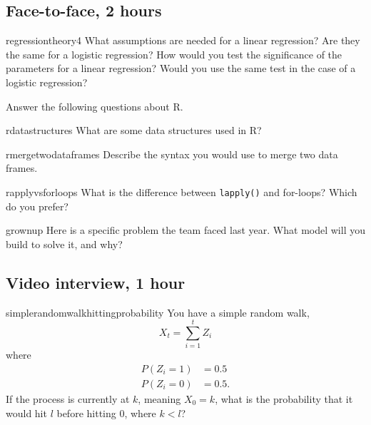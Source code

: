 \documentclass[a4paper]{article}
\begin{document}
\clearpage
\subsection{Face-to-face, 2 hours}
\begin{question}{regressiontheory4}
What assumptions are needed for a linear regression?
Are they the same for a logistic regression?
How would you test the significance of the parameters for a linear regression?
Would you use the same test in the case of a logistic regression?
\end{question}


\begin{questionwithnoanswer}
Answer the following questions about R.
\end{questionwithnoanswer}

\begin{subquestion}{rdatastructures}
What are some data structures used in R?
\end{subquestion}



\begin{subquestion}{rmergetwodataframes}
Describe the syntax you would use to merge two data frames.
\end{subquestion}



\begin{subquestion}{rapplyvsforloops}
What is the difference between \verb+lapply()+ and for-loops?
Which do you prefer?
\end{subquestion}


\begin{question}{grownup}
Here is a specific problem the team faced last year.
What model will you build to solve it, and why?
\end{question}

 \clearpage






\clearpage
\subsection{Video interview, 1 hour}
\begin{question}{simplerandomwalkhittingprobability}
You have a simple random walk,
\[
  X_t = \sum_{i=1}^{t}{Z_i}
\]
where
\begin{align*}
 P(Z_i = 1) &= 0.5 \\
 P(Z_i = 0) &= 0.5
 \text{.}
\end{align*}
If the process is currently at $k$, meaning $X_0=k$, what is the probability that it would hit $l$ before hitting $0$,
where $k < l$?
\end{question}
\end{document}
